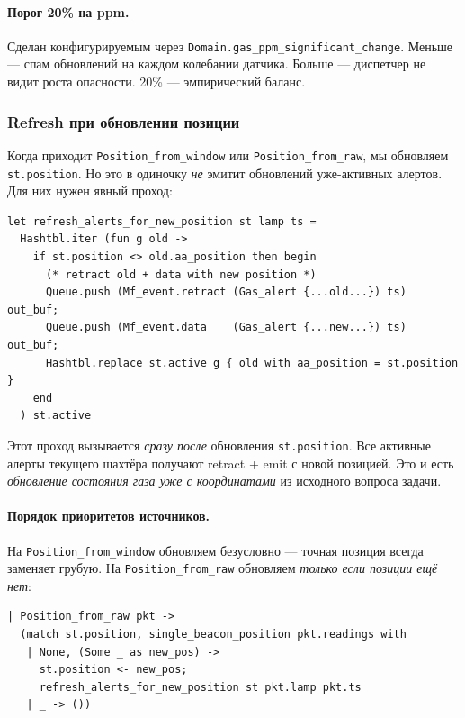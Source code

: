 \paragraph{Порог 20\% на ppm.} Сделан конфигурируемым через
\texttt{Domain.gas\_ppm\_significant\_change}. Меньше --- спам
обновлений на каждом колебании датчика. Больше --- диспетчер не
видит роста опасности. 20\% --- эмпирический баланс.

\subsubsection{Refresh при обновлении позиции}

Когда приходит \texttt{Position\_from\_window} или
\texttt{Position\_from\_raw}, мы обновляем \texttt{st.position}.
Но это в одиночку \emph{не} эмитит обновлений уже-активных алертов.
Для них нужен явный проход:

\begin{lstlisting}
let refresh_alerts_for_new_position st lamp ts =
  Hashtbl.iter (fun g old ->
    if st.position <> old.aa_position then begin
      (* retract old + data with new position *)
      Queue.push (Mf_event.retract (Gas_alert {...old...}) ts) out_buf;
      Queue.push (Mf_event.data    (Gas_alert {...new...}) ts) out_buf;
      Hashtbl.replace st.active g { old with aa_position = st.position }
    end
  ) st.active
\end{lstlisting}

Этот проход вызывается \emph{сразу после} обновления
\texttt{st.position}. Все активные алерты текущего шахтёра получают
retract + emit с новой позицией. Это и есть \emph{обновление состояния
газа уже с координатами} из исходного вопроса задачи.

\paragraph{Порядок приоритетов источников.} На \texttt{Position\_from\_window}
обновляем безусловно --- точная позиция всегда заменяет грубую.
На \texttt{Position\_from\_raw} обновляем \emph{только если позиции
ещё нет}:

\begin{lstlisting}
| Position_from_raw pkt ->
  (match st.position, single_beacon_position pkt.readings with
   | None, (Some _ as new_pos) ->
     st.position <- new_pos;
     refresh_alerts_for_new_position st pkt.lamp pkt.ts
   | _ -> ())
\end{lstlisting}

